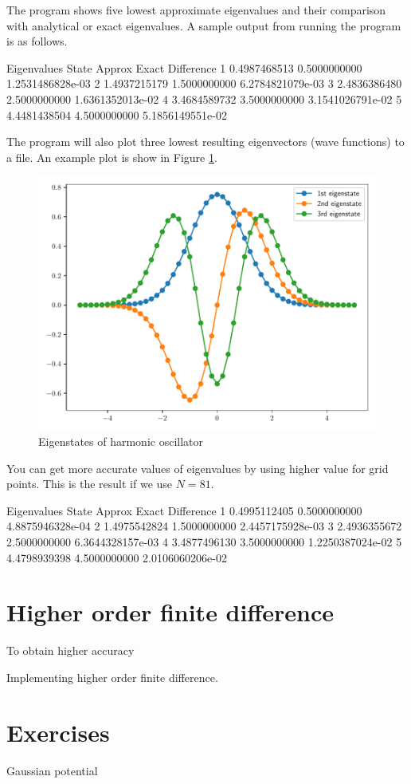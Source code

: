 The program shows five lowest approximate eigenvalues and their comparison with analytical or
exact eigenvalues. A sample output from running the program is as follows.
\begin{textcode}
Eigenvalues
State         Approx              Exact          Difference
   1       0.4987468513       0.5000000000   1.2531486828e-03
   2       1.4937215179       1.5000000000   6.2784821079e-03
   3       2.4836386480       2.5000000000   1.6361352013e-02
   4       3.4684589732       3.5000000000   3.1541026791e-02
   5       4.4481438504       4.5000000000   5.1856149551e-02 
\end{textcode}

The program will also plot three lowest resulting eigenvectors (wave functions) to a file.
An example plot is show in Figure \ref{fig:wfn_harm_01_51}.

\begin{figure}[H]
{\center
\includegraphics[scale=0.65]{../codes/sch_1d/IMG_main_harmonic_01_51.pdf}
\par}
\caption{Eigenstates of harmonic oscillator}
\label{fig:wfn_harm_01_51}
\end{figure}

You can get more accurate values of eigenvalues by using higher value for grid points.
This is the result if we use $N=81$.
\begin{textcode}
Eigenvalues
State         Approx              Exact          Difference
   1       0.4995112405       0.5000000000   4.8875946328e-04
   2       1.4975542824       1.5000000000   2.4457175928e-03
   3       2.4936355672       2.5000000000   6.3644328157e-03
   4       3.4877496130       3.5000000000   1.2250387024e-02
   5       4.4798939398       4.5000000000   2.0106060206e-02 
\end{textcode}


\section{Higher order finite difference}

To obtain higher accuracy

Implementing higher order finite difference.


\section{Exercises}

Gaussian potential
